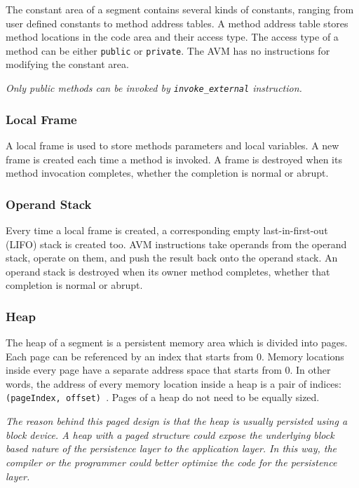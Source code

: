 \documentclass[11pt, A4]{report}
\begin{document}
    The constant area of a segment contains several kinds of constants, ranging from user defined constants to method
    address tables. A method address table stores method locations in the code area and their access type. The access
    type of a method can be either \texttt{public} or \texttt{private}. The AVM has no instructions for modifying the
    constant area.

    \emph{Only public methods can be invoked by \texttt{invoke\_external} instruction.}

    \subsubsection{Local Frame}

    A local frame is used to store methods parameters and local variables. A new frame is created each time a method
    is invoked. A frame is destroyed when its method invocation completes, whether the completion is normal or abrupt.

    \subsubsection{Operand Stack}

    Every time a local frame is created, a corresponding empty last-in-first-out (LIFO) stack is created too. AVM
    instructions take operands from the operand stack, operate on them, and push the result back onto the operand
    stack. An operand stack is destroyed when its owner method completes, whether that completion is normal or abrupt.

    \subsubsection{Heap}

    The heap of a segment is a persistent memory area which is divided into pages. Each page can be referenced by an
    index that starts from 0. Memory locations inside every page have a separate address space that starts from 0. In
    other words, the address of every memory location inside a heap is a pair of indices: \texttt{(pageIndex, offset)
    }. Pages of a heap do not need to be equally sized.

    \emph{The reason behind this paged design is that the heap is usually persisted using a block device. A heap with
    a paged structure could expose the underlying block based nature of the persistence layer to the application
    layer. In this way, the compiler or the programmer could better optimize the code for the persistence layer.}
\end{document}

